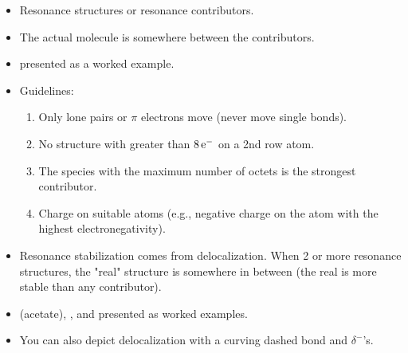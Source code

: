 \documentclass[../notes.tex]{subfiles}
\begin{document}
\begin{itemize}
    \begin{itemize}
        \item Resonance structures or resonance contributors.
        \item The actual molecule is somewhere between the contributors.
        \item {} presented as a worked example.
        \item Guidelines:
        \begin{enumerate}
            \item Only lone pairs or $\pi$ electrons move (never move single bonds).
            \item No structure with greater than $8\,\e[-]$ on a 2nd row atom.
            \item The species with the maximum number of octets is the strongest contributor.
            \item Charge on suitable atoms (e.g., negative charge on the atom with the highest electronegativity).
        \end{enumerate}
        \item Resonance stabilization comes from delocalization. When 2 or more resonance structures, the "real" structure is somewhere in between (the real is more stable than any contributor).
        \item {} (acetate), , and  presented as worked examples.
        \item You can also depict delocalization with a curving dashed bond and $\delta^-$'s.
    \end{itemize}
\end{itemize}
\end{document}
